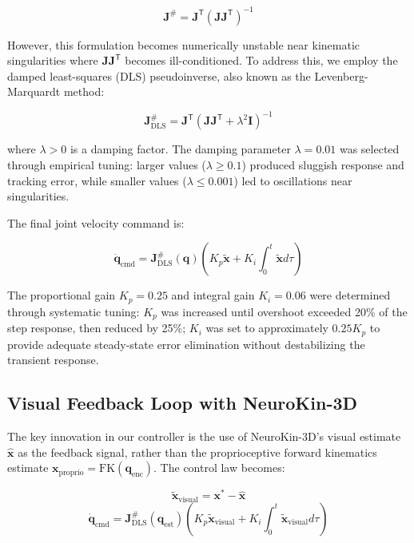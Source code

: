 \documentclass[12pt,a4paper,oneside]{report}
\begin{document}
\begin{equation}
\mathbf{J}^{\#} = \mathbf{J}^{\mathsf{T}} (\mathbf{J} \mathbf{J}^{\mathsf{T}})^{-1}
\end{equation}

However, this formulation becomes numerically unstable near kinematic singularities where $\mathbf{J} \mathbf{J}^{\mathsf{T}}$ becomes ill-conditioned. To address this, we employ the damped least-squares (DLS) pseudoinverse, also known as the Levenberg-Marquardt method:

\begin{equation}
\mathbf{J}^{\#}_{\text{DLS}} = \mathbf{J}^{\mathsf{T}} (\mathbf{J} \mathbf{J}^{\mathsf{T}} + \lambda^2 \mathbf{I})^{-1}
\end{equation}

where $\lambda > 0$ is a damping factor. The damping parameter $\lambda = 0.01$ was selected through empirical tuning: larger values ($\lambda \geq 0.1$) produced sluggish response and tracking error, while smaller values ($\lambda \leq 0.001$) led to oscillations near singularities.

The final joint velocity command is:

\begin{equation}
\dot{\mathbf{q}}_{\text{cmd}} = \mathbf{J}^{\#}_{\text{DLS}}(\mathbf{q}) \left( K_p \tilde{\mathbf{x}} + K_i \int_0^t \tilde{\mathbf{x}} d\tau \right)
\end{equation}

The proportional gain $K_p = 0.25$ and integral gain $K_i = 0.06$ were determined through systematic tuning: $K_p$ was increased until overshoot exceeded 20\% of the step response, then reduced by 25\%; $K_i$ was set to approximately $0.25 K_p$ to provide adequate steady-state error elimination without destabilizing the transient response.

\subsection{Visual Feedback Loop with NeuroKin-3D}

The key innovation in our controller is the use of NeuroKin-3D's visual estimate $\hat{\mathbf{x}}$ as the feedback signal, rather than the proprioceptive forward kinematics estimate $\mathbf{x}_{\text{proprio}} = \text{FK}(\mathbf{q}_{\text{enc}})$. The control law becomes:

\begin{equation}
\tilde{\mathbf{x}}_{\text{visual}} = \mathbf{x}^* - \hat{\mathbf{x}}
\end{equation}
\begin{equation}
\dot{\mathbf{q}}_{\text{cmd}} = \mathbf{J}^{\#}_{\text{DLS}}(\mathbf{q}_{\text{est}}) \left( K_p \tilde{\mathbf{x}}_{\text{visual}} + K_i \int_0^t \tilde{\mathbf{x}}_{\text{visual}} d\tau \right)
\end{equation}
\end{document}
